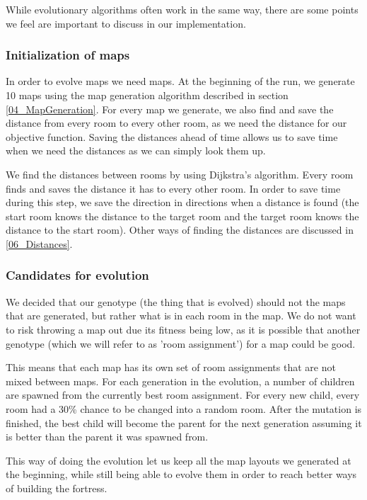 While evolutionary algorithms often work in the same way, there are some points we feel are important to discuss in our implementation.

\subsubsection{Initialization of maps}
\label{04_Evolution_Initialization}

In order to evolve maps we need maps. At the beginning of the run, we generate 10 maps using the map generation algorithm described in section \ref{04_MapGeneration}. For every map we generate, we also find and save the distance from every room to every other room, as we need the distance for our objective function. Saving the distances ahead of time allows us to save time when we need the distances as we can simply look them up. 

We find the distances between rooms by using Dijkstra's algorithm\cite{Dijkstra}\cite{DijkstraOriginal}. Every room finds and saves the distance it has to every other room. In order to save time during this step, we save the direction in directions when a distance is found (the start room knows the distance to the target room and the target room knows the distance to the start room). Other ways of finding the distances are discussed in \ref{06_Distances}.

\subsubsection{Candidates for evolution}

We decided that our genotype (the thing that is evolved) should not the maps that are generated, but rather what is in each room in the map. We do not want to risk throwing a map out due its fitness being low, as it is possible that another genotype (which we will refer to as 'room assignment') for a map could be good.

This means that each map has its own set of room assignments that are not mixed between maps. For each generation in the evolution, a number of children are spawned from the currently best room assignment. For every new child, every room had a 30\% chance to be changed into a random room. After the mutation is finished, the best child will become the parent for the next generation assuming it is better than the parent it was spawned from.

This way of doing the evolution let us keep all the map layouts we generated at the beginning, while still being able to evolve them in order to reach better ways of building the fortress.


